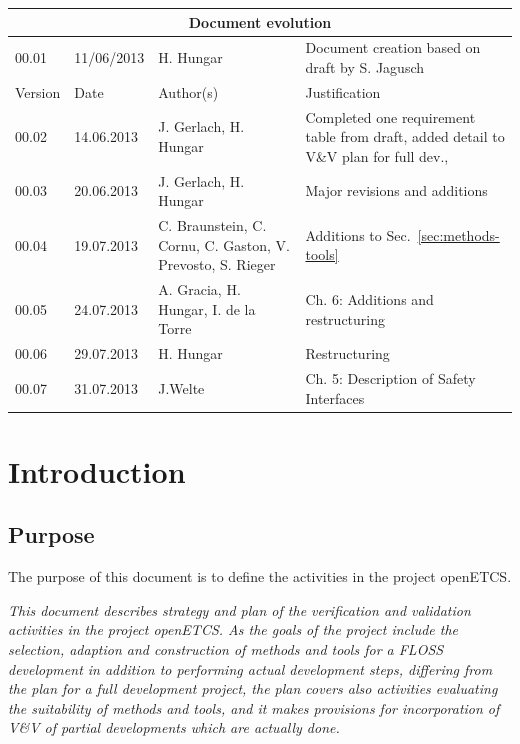 \documentclass{template/openetcs_report}
\begin{document}
\begin{tabular}{|p{2.2cm}|p{2cm}|p{3cm}|p{5cm}|}
\hline
\multicolumn{4}{|c|}{Document evolution} \\
\hline
00.01 & 11/06/2013 & H. Hungar &  Document creation based on draft by
S. Jagusch\\
\hline
Version &  Date & Author(s) & Justification  \\
\hline  
00.02 & 14.06.2013 & J. Gerlach, H. Hungar &  Completed one
requirement table from draft, added detail to V\&V plan for full dev., \\
\hline  
00.03 & 20.06.2013 & J. Gerlach, H. Hungar & Major revisions and
additions
\\\hline
00.04 & 19.07.2013 & C. Braunstein, C. Cornu, C. Gaston, V. Prevosto,
S. Rieger & Additions to Sec.~\ref{sec:methods-tools}
\\\hline
00.05 & 24.07.2013 & A. Gracia, H. Hungar, I. de la Torre & Ch. 6: Additions and
restructuring 
\\\hline
00.06 & 29.07.2013 & H. Hungar & Restructuring
\\\hline
00.07 & 31.07.2013 & J.Welte & Ch. 5: Description of Safety Interfaces
\\
\hline
\end{tabular}




\mainmatter

\chapter{Introduction}

\section{Purpose}
\label{sec:purpose}

The purpose of this document is to define the \vv activities in the
project openETCS.  

{\it This document describes strategy and plan of the
  verification and validation activities in the project openETCS. As
  the goals of the project include the selection, adaption and
  construction of methods and tools for a FLOSS development in
  addition to performing actual development steps, differing from the
  plan for a full development project, the plan covers also activities
  evaluating the suitability of methods and tools, and it makes
  provisions for incorporation of V\&V of partial developments which
  are actually done.}
\end{document}
